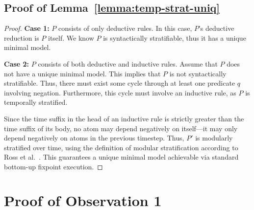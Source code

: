 \appendix


\subsection{Proof of Lemma~\ref{lemma:temp-strat-uniq}}

\begin{proof}
%
{\bf Case 1:} $P$ consists of only deductive rules.  In this case, $P$'s
deductive reduction is $P$ itself.  We know $P$ is syntactically stratifiable,
thus it has a unique minimal model.

{\bf Case 2:} $P$ consists of both deductive and inductive rules.  Assume that
$P$ does not have a unique minimal model.  This implies that $P$ is not
syntactically stratifiable.  Thus, there must exist some cycle through at least
one predicate $q$ involving negation.
Furthermore, this cycle must involve an inductive rule, as $P$ is temporally
stratified.

Since the time suffix in the head of an inductive rule is strictly greater than
the time suffix of its body, no atom may depend negatively on itself---it may
only depend negatively on atoms in the previous timestep.  Thus, $P'$ is
modularly stratified over time, using the definition of modular stratification
according to Ross et al.~\cite{modular}.  This guarantees a unique minimal model
achievable via standard bottom-up fixpoint execution.
%
%
\end{proof}

\section{Proof of Observation 1}

